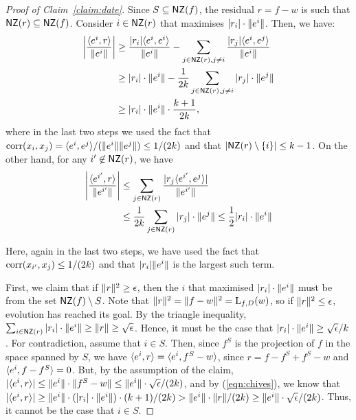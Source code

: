 \begin{proof}[Proof of Claim~\ref{claim:date}] Since $S \subseteq \mathsf{NZ}(f)$, the
residual $r = f - w$ is such that $\mathsf{NZ}(r) \subseteq \mathsf{NZ}(f)$. Consider $i \in \mathsf{NZ}(r)$
that maximises $|r_i|\cdot \Vert e^i \Vert$. Then, we have:
\begin{align}
\left|\frac{\langle e^i, r \rangle}{\Vert e^i \Vert} \right| &\geq
\frac{|r_i|\langle e^i, e^i \rangle}{\Vert e^i \Vert} - \sum_{j \in \mathsf{NZ}(r), j \neq i}
\frac{|r_j|\langle e^i, e^j \rangle}{\Vert e^i \Vert} \nonumber  \\
&\geq |r_i|\cdot \Vert e^i \Vert - \frac{1}{2k} \sum_{j \in \mathsf{NZ}(r), j \neq i}
|r_j| \cdot \Vert e^j \Vert \label{eqn:chives} \\
&\geq |r_i| \cdot \Vert e^i \Vert \cdot \frac{k+1}{2k}, \nonumber
\end{align}
where in the last two steps we used the fact that $\mathrm{corr}(x_i, x_j) =
\langle e^i, e^j \rangle/(\Vert e^i \Vert \Vert e^j \Vert) \leq 1/(2k)$ and that $|\mathsf{NZ}(r)
\setminus \{ i \}| \leq k-1$. On the other hand, for any $i^\prime \not\in
\mathsf{NZ}(r)$, we have
\begin{align}
\left| \frac{\langle e^{i^\prime}, r \rangle}{\Vert e^{i^\prime} \Vert} \right| &\leq
\sum_{j \in \mathsf{NZ}(r)} \frac{|r_j\langle e^{i^\prime}, e^j \rangle|}{\Vert e^{i^\prime} \Vert}
\nonumber \\
&\leq \frac{1}{2k} \sum_{j \in \mathsf{NZ}(r)} |r_j| \cdot \Vert e^j \Vert \leq \frac{1}{2}
|r_i| \cdot \Vert e^i \Vert \label{eqn:dill}
\end{align}

\noindent Here, again in the last two steps, we have used the fact that
$\mathrm{corr}(x_{i^\prime}, x_j) \leq 1/(2k)$ and that $|r_i| \Vert e^i \Vert$
is the largest such term.

First, we claim that if $\Vert r \Vert^2 \geq \epsilon$, then the $i$ that
maximised $|r_i| \cdot \Vert e^i \Vert$ must be from the set $\mathsf{NZ}(f) \setminus
S$. Note that $\Vert r \Vert^2 = \Vert f - w \Vert^2 = \mathrm{L}_{f, D}(w)$, so if
$\Vert r \Vert^2 \leq \epsilon$, evolution has reached its goal. By the
triangle inequality, $\sum_{i \in \mathsf{NZ}(r)} |r_i| \cdot \Vert e^i \Vert \geq
\Vert r \Vert \geq \sqrt{\epsilon}$. Hence, it must be the case that $|r_i| \cdot
\Vert e^i \Vert \geq \sqrt{\epsilon}/{k}$. For contradiction, assume that $i \in
S$. Then, since $f^S$ is the projection of $f$ in the space spanned by $S$, we
have $\langle e^i, r \rangle = \langle e^i, f^S - w \rangle$, since $r = f - f^S + f^S - w$ and
$\langle e^i, f - f^S \rangle = 0$. But, by the assumption of the claim, $|\langle e^i, r \rangle|\leq
\Vert e^i \Vert \cdot \Vert f^S - w \Vert \leq \Vert e^i \Vert \cdot
\sqrt{\epsilon}/(2k)$, and by (\ref{eqn:chives}), we know that $|\langle e^i, r \rangle|
\geq \Vert e^i \Vert \cdot (|r_i| \cdot \Vert e^i \Vert) \cdot (k+1)/(2k) >
\Vert e^i \Vert \cdot \Vert r \Vert / (2k) \ge \Vert e^i \Vert \cdot \sqrt{\epsilon}/(2k)$.
Thus, it cannot be the case that $i \in S$.


\end{proof}
